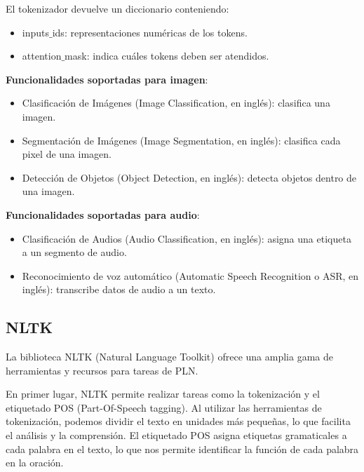 \begin{itemize}
El tokenizador devuelve un diccionario conteniendo:
\begin{itemize}
	\item inputs$\_$ids: representaciones numéricas de los tokens. %
	\item attention$\_$mask:  indica cuáles tokens deben ser atendidos. %
\end{itemize}

\end{itemize}

\textbf{Funcionalidades soportadas para imagen}:
\begin{itemize}
	\item Clasificación de Imágenes (Image Classification, en inglés): clasifica una imagen.
	\item Segmentación de Imágenes (Image Segmentation, en inglés): clasifica cada pixel de una imagen.
	\item Detección de Objetos (Object Detection, en inglés): detecta objetos dentro de una imagen.
\end{itemize}

\textbf{Funcionalidades soportadas para audio}:
\begin{itemize}
	\item Clasificación de Audios (Audio Classification, en inglés): asigna una etiqueta a un segmento de audio.
	\item Reconocimiento de voz automático (Automatic Speech Recognition o ASR, en inglés): transcribe datos de audio a un texto.
\end{itemize}


\subsection{NLTK}
La biblioteca NLTK (Natural Language Toolkit) ofrece una amplia gama de herramientas y recursos para tareas de PLN.

En primer lugar, NLTK permite realizar tareas como la tokenización y el  etiquetado POS (Part-Of-Speech tagging). Al utilizar las herramientas de tokenización, podemos dividir el texto en unidades más pequeñas, lo que facilita el análisis y la comprensión. El etiquetado POS asigna etiquetas gramaticales a cada palabra en el texto, lo que nos permite identificar la función de cada palabra en la oración. 

